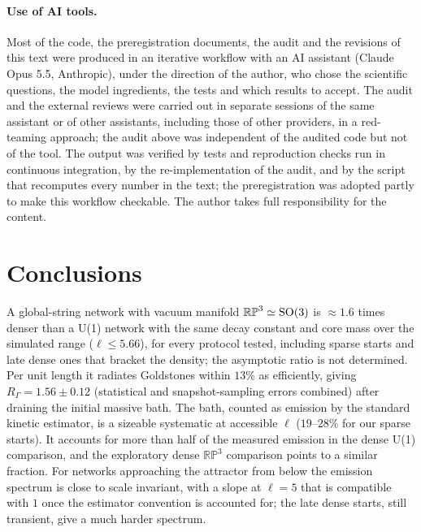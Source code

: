 \documentclass[prd,twocolumn,superscriptaddress,nofootinbib,amsmath,amssymb]{revtex4-2}
\newcommand{\RP}{\mathbb{RP}^3}
\newcommand{\RG}{R_\Gamma}
\begin{document}
\paragraph{Use of AI tools.} Most of the code, the preregistration documents, the audit and the revisions of this text were produced in an iterative workflow with an AI assistant (Claude Opus 5.5, Anthropic), under the direction of the author, who chose the scientific questions, the model ingredients, the tests and which results to accept.
The audit and the external reviews were carried out in separate sessions of the same assistant or of other assistants, including those of other providers, in a red-teaming approach; the audit above was independent of the audited code but not of the tool.
The output was verified by tests and reproduction checks run in continuous integration, by the re-implementation of the audit, and by the script that recomputes every number in the text; the preregistration was adopted partly to make this workflow checkable.
The author takes full responsibility for the content.

\section{Conclusions}

A global-string network with vacuum manifold $\RP\simeq{\rm SO}(3)$ is $\approx1.6$ times denser than a U(1) network with the same decay constant and core mass over the simulated range ($\ell\le5.66$), for every protocol tested, including sparse starts and late dense ones that bracket the density; the asymptotic ratio is not determined. Per unit length it radiates Goldstones within $13\%$ as efficiently, giving $\RG=1.56\pm0.12$ (statistical and snapshot-sampling errors combined) after draining the initial massive bath.
The bath, counted as emission by the standard kinetic estimator, is a sizeable systematic at accessible $\ell$ ($19$--$28\%$ for our sparse starts). It accounts for more than half of the measured emission in the dense U(1) comparison, and the exploratory dense $\RP$ comparison points to a similar fraction.
For networks approaching the attractor from below the emission spectrum is close to scale invariant, with a slope at $\ell=5$ that is compatible with $1$ once the estimator convention is accounted for; the late dense starts, still transient, give a much harder spectrum.



\end{document}
